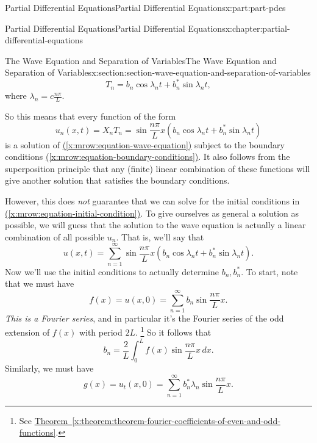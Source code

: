 \documentclass[oneside,10pt,]{book}
\newcommand{\xreffont}{\relax}
\numberwithin{equation}{part}
\begin{document}
\begin{partptx}{Partial Differential Equations}{}{Partial Differential Equations}{}{}{x:part:part-pdes}
\begin{chapterptx}{Partial Differential Equations}{}{Partial Differential Equations}{}{}{x:chapter:partial-differential-equations}
\begin{sectionptx}{The Wave Equation and Separation of Variables}{}{The Wave Equation and Separation of Variables}{}{}{x:section:section-wave-equation-and-separation-of-variables}
\begin{equation*}
T_{n} = b_{n}\cos\lambda_{n}t+b^{*}_{n}\sin\lambda_{n}t,
\end{equation*}
where \(\lambda_{n} = c\frac{n\pi}{L}\).%
\par
So this means that every function of the form%
\begin{equation*}
u_{n}(x,t) = X_{n}T_{n} = \sin\frac{n\pi}{L}x\left(b_{n}\cos\lambda_{n}t+b^{*}_{n}\sin\lambda_{n}t\right)
\end{equation*}
is a solution of \hyperref[x:mrow:equation-wave-equation]{({\xreffont\ref{x:mrow:equation-wave-equation}})} subject to the boundary conditions \hyperref[x:mrow:equation-boundary-conditions]{({\xreffont\ref{x:mrow:equation-boundary-conditions}})}. It also follows from the superposition principle that any (finite) linear combination of these functions will give another solution that satisfies the boundary conditions.%
\par
However, this does \emph{not} guarantee that we can solve for the initial conditions in \hyperref[x:mrow:equation-initial-condition]{({\xreffont\ref{x:mrow:equation-initial-condition}})}. To give ourselves as general a solution as possible, we will guess that the solution to the wave equation is actually a linear combination of all possible \(u_{n}\). That is, we'll say that%
%
\begin{equation*}
u(x,t) = \sum_{n=1}^{\infty}\sin\frac{n\pi}{L}x\left(b_{n}\cos\lambda_{n}t+b^{*}_{n}\sin\lambda_{n}t\right).
\end{equation*}
Now we'll use the initial conditions to actually determine \(b_{n},b^{*}_{n}\). To start, note that we must have%
\begin{equation*}
f(x) = u(x,0) = \sum_{n=1}^{\infty}b_{n}\sin\frac{n\pi}{L}x.
\end{equation*}
\emph{This is a Fourier series}, and in particular it's the Fourier series of the odd extension of \(f(x)\) with period \(2L\). \footnote{See \hyperref[x:theorem:theorem-fourier-coefficients-of-even-and-odd-functions]{Theorem~{\xreffont\ref{x:theorem:theorem-fourier-coefficients-of-even-and-odd-functions}}}.\label{g:fn:idp105548780944544}} So it follows that%
%
\begin{equation*}
b_{n} = \frac{2}{L}\int_{0}^{L}f(x)\sin\frac{n\pi}{L}x\,dx.
\end{equation*}
Similarly, we must have%
\begin{equation*}
g(x) = u_{t}(x,0) = \sum_{n=1}^{\infty}b_{n}^{*}\lambda_{n}\sin\frac{n\pi}{L}x.
\end{equation*}

\end{sectionptx}
\end{chapterptx}
\end{partptx}
\end{document}
